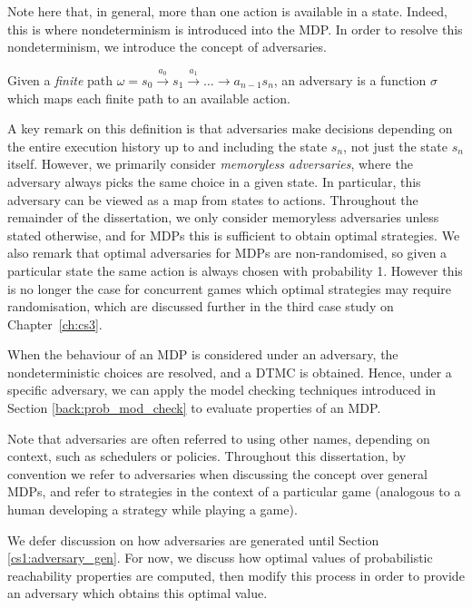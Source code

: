 Note here that, in general, more than one action is available in a state. Indeed, this is where nondeterminism is introduced into the MDP. In order to resolve this nondeterminism, we introduce the concept of adversaries.

\begin{definition}
\label{cs1:adversaries}

Given a \emph{finite} path $\omega = s_0 \xrightarrow{a_0} s_1 \xrightarrow{a_1} \dots \rightarrow{a_{n-1}} s_n$, an adversary is a function $\sigma$ which maps each finite path to an available action.

\end{definition}
 
A key remark on this definition is that adversaries make decisions depending on the entire execution history up to and including the state $s_n$, not just the state $s_n$ itself. However, we primarily consider \emph{memoryless adversaries}, where the adversary always picks the same choice in a given state. In particular, this adversary can be viewed as a map from states to actions. Throughout the remainder of the dissertation, we only consider memoryless adversaries unless stated otherwise, and for MDPs this is sufficient to obtain optimal strategies.  We also remark that optimal adversaries for MDPs are non-randomised, so given a particular state the same action is always chosen with probability 1. However this is no longer the case for concurrent games which optimal strategies may require randomisation, which are discussed further in the third case study on Chapter~\ref{ch:cs3}.

When the behaviour of an MDP is considered under an adversary, the nondeterministic choices are resolved, and a DTMC is obtained. Hence, under a specific adversary, we can apply the model checking techniques introduced in Section \ref{back:prob_mod_check} to evaluate properties of an MDP.

Note that adversaries are often referred to using other names, depending on context, such as schedulers or policies. Throughout this dissertation, by convention we refer to adversaries when discussing the concept over general MDPs, and refer to strategies in the context of a particular game (analogous to a human developing a strategy while playing a game).

We defer discussion on how adversaries are generated until Section \ref{cs1:adversary_gen}. For now, we discuss how optimal values of probabilistic reachability properties are computed, then modify this process in order to provide an adversary which obtains this optimal value.

